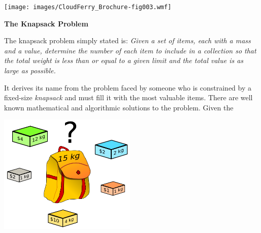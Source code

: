 \documentclass{article}
\begin{document}
\vspace{2pt}
\begin{center}
\texttt{[image: images/CloudFerry\_Brochure-fig003.wmf]}

\end{center}

\vspace{2pt}
{\color{color03} \textbf{The Knapsack Problem}}

\vspace{2pt}
{\color{color02} The knapsack problem simply stated is: }{\color{color02} \textit{Given 
a set of items, each with a mass and a value, determine the number of each item 
to include in a collection so that the total weight is less than or equal to a 
given limit and the total value is as large as possible. }}

\vspace{2pt}
{\color{color02} It derives its name from the problem faced by someone who is constrained 
by a fixed-size }{\color{color02} \emph{knapsack}}{\color{color02}  and must fill 
it with the most valuable items. There are well known mathematical and algorithmic 
solutions to the problem. Given the }

\vspace{2pt}
\begin{center}
\includegraphics[width=186pt, height=161pt, keepaspectratio=true]{images/CloudFerry_Brochure-fig004.png}

\end{center}

\vspace{4pt}
\baselineskip=12pt
\end{document}
